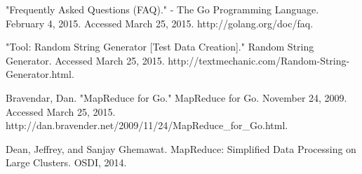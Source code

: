 \documentclass[report]{IEEEtran}
\begin{document}






%
%
%
\begin{thebibliography}{9}

"Frequently Asked Questions (FAQ)." - The Go Programming Language. 
February 4, 2015. Accessed March 25, 2015. http://golang.org/doc/faq.

"Tool: Random String Generator [Test Data Creation]." Random String Generator. 
Accessed March 25, 2015. http://textmechanic.com/Random-String-Generator.html.

Bravendar, Dan. "MapReduce for Go." MapReduce for Go. November 24, 2009. 
Accessed March 25, 2015. http://dan.bravender.net/2009/11/24/MapReduce\_for\_Go.html.

Dean, Jeffrey, and Sanjay Ghemawat. MapReduce: Simplified Data Processing on Large Clusters. OSDI, 2014.

\end{thebibliography}
\end{document}
